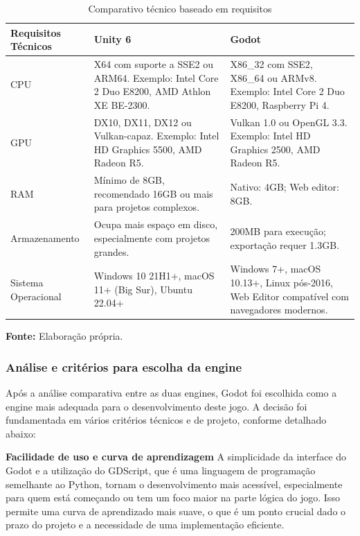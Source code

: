 \begin{table}[H]
\centering
\caption{Comparativo técnico baseado em requisitos}
\label{tab:comparativo-tecnico-engines}
\begin{tabularx}{\textwidth}{|>{\raggedright\arraybackslash}X|>{\raggedright\arraybackslash}X|>{\raggedright\arraybackslash}X|}
\hline
\textbf{Requisitos Técnicos} & \textbf{Unity 6} & \textbf{Godot} \\
\hline
CPU & 
X64 com suporte a SSE2 ou ARM64. Exemplo: Intel Core 2 Duo E8200, AMD Athlon XE BE-2300. & 
X86\_32 com SSE2, X86\_64 ou ARMv8. Exemplo: Intel Core 2 Duo E8200, Raspberry Pi 4. \\
\hline
GPU & 
DX10, DX11, DX12 ou Vulkan-capaz. Exemplo: Intel HD Graphics 5500, AMD Radeon R5. & 
Vulkan 1.0 ou OpenGL 3.3. Exemplo: Intel HD Graphics 2500, AMD Radeon R5. \\
\hline
RAM & 
Mínimo de 8GB, recomendado 16GB ou mais para projetos complexos. & 
Nativo: 4GB; Web editor: 8GB. \\
\hline
Armazenamento & 
Ocupa mais espaço em disco, especialmente com projetos grandes. & 
200MB para execução; exportação requer 1.3GB. \\
\hline
Sistema Operacional & 
Windows 10 21H1+, macOS 11+ (Big Sur), Ubuntu 22.04+ & 
Windows 7+, macOS 10.13+, Linux pós-2016, Web Editor compatível com navegadores modernos. \\
\hline
\end{tabularx}

\smallskip
\raggedleft \textbf{Fonte:} Elaboração própria.
\end{table}

\subsubsection{Análise e critérios para escolha da engine}

Após a análise comparativa entre as duas engines, Godot foi escolhida como a engine mais adequada para o desenvolvimento deste jogo. A decisão foi fundamentada em vários critérios técnicos e de projeto, conforme detalhado abaixo:

\textbf{Facilidade de uso e curva de aprendizagem}
A simplicidade da interface do Godot e a utilização do GDScript, que é uma linguagem de programação semelhante ao Python, tornam o desenvolvimento mais acessível, especialmente para quem está começando ou tem um foco maior na parte lógica do jogo. Isso permite uma curva de aprendizado mais suave, o que é um ponto crucial dado o prazo do projeto e a necessidade de uma implementação eficiente.

